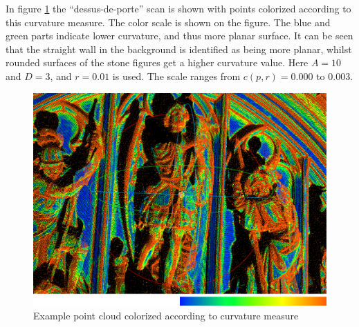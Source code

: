 In figure \ref{fig:curvature_example} the ``dessus-de-porte'' scan is shown with points colorized according to this curvature measure. The color scale is shown on the figure. The blue and green parts indicate lower curvature, and thus more planar surface. It can be seen that the straight wall in the background is identified as being more planar, whilst rounded surfaces of the stone figures get a higher curvature value. Here $A = 10$ and $D = 3$, and $r = 0.01$ is used. The scale ranges from $c(p, r) = 0.000$ to $0.003$.


\begin{figure}[p]
\centering
\includegraphics[width=.7\textwidth]{fig/curvature_example.png}
\caption{Example point cloud colorized according to curvature measure}
\label{fig:curvature_example}
\end{figure}



